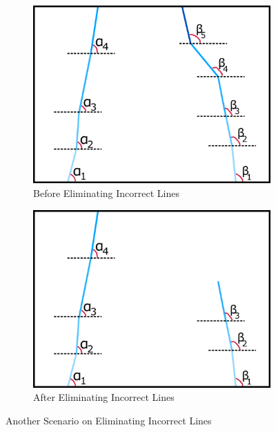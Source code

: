 \documentclass[a4paper,12pt]{article}
\begin{document}
\begin{enumerate}
\begin{figure}[H]
\end{figure}
\begin{figure}[H]
	\setlength{\unitlength}{\textwidth} 
	\centering
	\begin{subfigure}{.46\textwidth}
		\centering
		\includegraphics[width=0.44\unitlength]{images/dataP_explained3}
		\caption{\label{fig:dataP_explained3} Before Eliminating Incorrect Lines}
	\end{subfigure}%
	\begin{subfigure}{.46\textwidth}
		\centering
		\includegraphics[width=0.44\unitlength]{images/dataP_explained4}
		\caption{\label{fig:dataP_explained4} After Eliminating Incorrect Lines}
	\end{subfigure}
	\caption{\label{fig:dataP_explainedBroken} Another Scenario on Eliminating Incorrect Lines}
\end{figure}


\end{enumerate}
\end{document}
